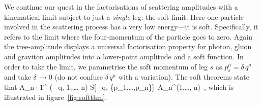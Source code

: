 We continue our quest in the factorisations of scattering amplitudes with a kinematical limit
subject to just a \emph{single} leg: the soft limit. Here one particle involved in the scattering process 
has a very low energy---it is soft. Specifically, it refers to the limit where the four-momentum of the particle 
goes to zero. Again the tree-amplitude displays a universal factorisation property 
for photon, gluon and graviton amplitudes into a lower-point amplitude and a soft function. 
In order to take the limit, we parametrise the soft momentum of leg $s$ as
$p_{s}^{\mu} =  \delta\,  q^{\mu}$ and take $ \delta\, \to 0$ (do not confuse $ \delta\,  q^{\mu}$ 
with a variation). The soft theorems state that
%
\be
\label{centralsoft}
A_{n+1}^{} ( \delta\,  q, 1,\ldots , n) 
S[ \delta\,   q,  \{p_1,\ldots,p_{n}\}]\, A_{n}^{}(1,\ldots , n)\, ,
\ee
%
which is illustrated in figure~\ref{fig:softthm}. 
%
